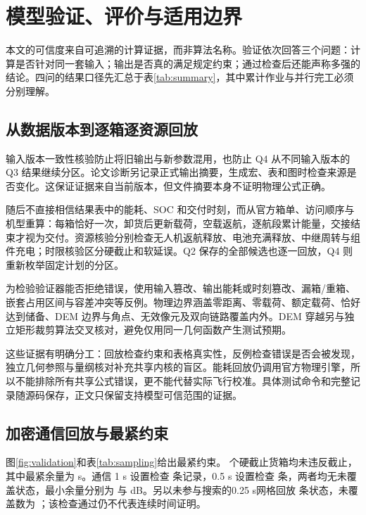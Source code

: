 \section{模型验证、评价与适用边界}\label{sec:validation}
本文的可信度来自可追溯的计算证据，而非算法名称。验证依次回答三个问题：计算是否针对同一套输入；输出是否真的满足规定约束；通过检查后还能声称多强的结论。四问的结果口径先汇总于表\ref{tab:summary}，其中累计作业与并行完工必须分别理解。

\subsection{从数据版本到逐箱逐资源回放}
输入版本一致性核验防止将旧输出与新参数混用，也防止 Q4 从不同输入版本的 Q3 结果继续分区。论文诊断另记录正式输出摘要，生成宏、表和图时检查来源是否变化。这保证证据来自当前版本，但文件摘要本身不证明物理公式正确。

随后不直接相信结果表中的能耗、SOC 和交付时刻，而从官方箱单、访问顺序与机型重算：每箱恰好一次，卸货后更新载荷，空载返航，逐航段累计能量，交接结束才视为交付。资源核验分别检查无人机返航释放、电池充满释放、中继周转与组件充电；时限核验区分硬截止和软延误。Q2 保存的全部候选也逐一回放，Q4 则重新枚举固定计划的分区。

为检验验证器能否拒绝错误，使用输入篡改、输出能耗或时刻篡改、漏箱/重箱、嵌套占用区间与容差冲突等反例。物理边界涵盖零距离、零载荷、额定载荷、恰好达到储备、DEM 边界与角点、无效像元及双向链路覆盖内外。DEM 穿越另与独立矩形裁剪算法交叉核对，避免仅用同一几何函数产生测试预期。

这些证据有明确分工：回放检查约束和表格真实性，反例检查错误是否会被发现，独立几何参照与量纲核对补充共享内核的盲区。能耗回放仍调用官方物理引擎，所以不能排除所有共享公式错误，更不能代替实际飞行校准。具体测试命令和完整记录随源码保存，正文只保留支持模型可信范围的证据。

\subsection{加密通信回放与最紧约束}
图\ref{fig:validation}和表\ref{tab:sampling}给出最紧约束。\HardBoxes{} 个硬截止货箱均未违反截止，其中最紧余量为\HardSlack{} s。通信 1 s 设置检查 \StatesOne{} 条记录，0.5 s 设置检查 \StatesHalf{} 条，两者均无未覆盖状态，最小余量分别为 \MarginOne{} 与 \MarginHalf{} dB。另以未参与搜索的0.25 s网格回放 \StatesQuarter{} 条状态，未覆盖数为 \ViolationsQuarter{}；该检查通过仍不代表连续时间证明。


